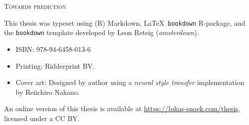 \documentclass[12pt,american,a4paper,oneside,]{memoir} %
\newcommand{\CoverName}{cover} %
\begin{document}

\setlength{\abstitleskip}{-\absparindent}

\pagestyle{empty}
\renewcommand{\thepage}{\CoverName} %


\frontmatter
\thispagestyle{empty}
\def\drop{.1\textheight}

\vspace*{\drop}
\begin{center}
\Huge \textsc{Towards prediction}
\end{center}

\clearpage
\thispagestyle{empty}
\vspace*{\fill}
\begingroup %
\small
\setlength{\parskip}{\baselineskip} %
\setlength\parindent{0pt} %

This thesis was typeset using (R) Markdown, \LaTeX\, \verb+bookdown+ R-package, and the \verb+bookdown+ template developed by Leon Reteig (\textit{amsterdown}).

\begin{itemize}[label={}, itemsep=0pt, partopsep=3pt, topsep=-\parskip, parsep=0pt, leftmargin=1em]
  \item ISBN: 978-94-6458-013-6 
  \item Printing: Ridderprint BV. 
  \item Cover art: Designed by author using a \emph{neural style transfer} implementation by Reiichiro Nakano. 
\end{itemize}

\noindent An online version of this thesis is available at \url{https://lukas-snoek.com/thesis}, licensed under a CC BY.
\endgroup
\end{document}
